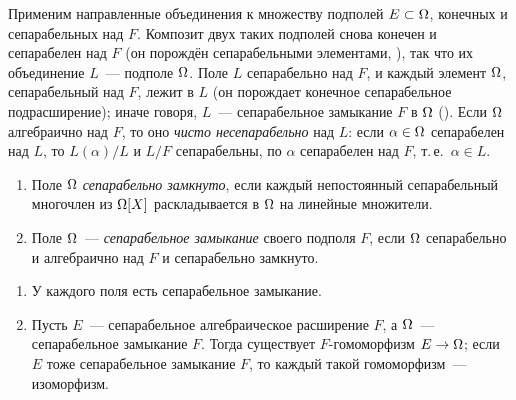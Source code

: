 Применим направленные объединения к множеству подполей $E\subset\Omega$, конечных и сепарабельных над $F$. Композит двух
таких подполей снова конечен и сепарабелен над $F$ (он порождён сепарабельными элементами, ), так что их
объединение $L$~--- подполе $\Omega$. Поле $L$ сепарабельно над $F$, и каждый элемент $\Omega$, сепарабельный над $F$, лежит в
$L$ (он порождает конечное сепарабельное подрасширение); иначе говоря, $L$~--- сепарабельное замыкание $F$ в $\Omega$
(). Если $\Omega$ алгебраично над $F$, то оно \emph{чисто несепарабельно} над $L$: если $\alpha\in\Omega$ сепарабелен над
$L$, то $L(\alpha)/L$ и $L/F$ сепарабельны, по  $\alpha$ сепарабелен над $F$, т.\,е.\ $\alpha\in L$.

\begin{definition}[6.9]
\begin{enumerate}[label=(\alph*)]
\item Поле $\Omega$ \emph{сепарабельно замкнуто}, если каждый непостоянный сепарабельный многочлен из $\Omega[X]$
раскладывается в $\Omega$ на линейные множители.
\item Поле $\Omega$~--- \emph{сепарабельное замыкание} своего подполя $F$, если $\Omega$ сепарабельно и алгебраично над $F$ и
сепарабельно замкнуто.
\end{enumerate}
\end{definition}

\begin{theorem}[6.10]
\begin{enumerate}[label=(\alph*)]
\item У каждого поля есть сепарабельное замыкание.
\item Пусть $E$~--- сепарабельное алгебраическое расширение $F$, а $\Omega$~--- сепарабельное замыкание $F$. Тогда
существует $F$-гомоморфизм $E\to\Omega$; если $E$ тоже сепарабельное замыкание $F$, то каждый такой гомоморфизм~---
изоморфизм.
\end{enumerate}
\end{theorem}

